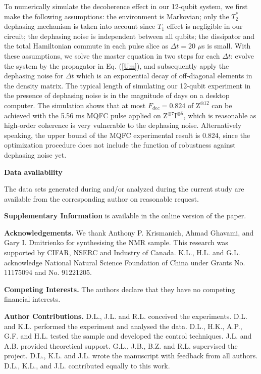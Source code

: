 \documentclass[twocolumn,reprint, amsmath,amssymb,showpacs,superscriptaddress]{revtex4-1}
\begin{document}
To numerically simulate the decoherence effect in our 12-qubit system, we first make the following assumptions: the environment is Markovian; only the $T_2^*$ dephasing mechanism is taken into account since $T_1$ effect is negligible in our circuit; the dephasing noise is independent between all qubits; the dissipator and the total Hamiltonian commute in each pulse slice as $\Delta t = 20$ $\mu$s is small. With these assumptions, we solve the master equation in two steps for each $\Delta t$: evolve the system by the propagator in Eq. (\ref{Um}), and subsequently apply the dephasing noise for $\Delta t$ which is an exponential decay of off-diagonal elements in the density matrix. The typical length of simulating our 12-qubit experiment in the presence of dephasing noise is in the magnitude of days on a desktop computer. The simulation shows that at most $F_{dec}=0.824$ of $\text{Z}^{\otimes 12}$ can be achieved with the 5.56 ms MQFC pulse applied on Z$^{\otimes 7}$I$^{\otimes 5}$, which is reasonable as high-order coherence is very vulnerable to the dephasing noise. Alternatively speaking, the upper bound of the MQFC experimental result is 0.824, since the optimization procedure does not include the function of robustness against dephasing noise yet.

\textbf{Data availability}

The data sets generated during and/or analyzed during the current study are available from the corresponding author on reasonable request.

\textbf{Supplementary Information} is available in the online version of the paper.

\textbf{Acknowledgements.} We thank Anthony P. Krismanich, Ahmad Ghavami, and Gary I. Dmitrienko for synthesising the NMR sample.  This
research was supported by CIFAR, NSERC and Industry of Canada. K.L., H.L. and G.L. acknowledge National Natural Science Foundation of China under Grants No. 11175094 and No. 91221205.

\textbf{Competing Interests.} The authors declare that they have no
competing financial interests.

\textbf{Author Contributions.} D.L., J.L. and R.L. conceived the experiments. D.L. and K.L. performed the experiment and analysed the data. D.L., H.K., A.P., G.F. and H.L. tested the sample and developed the control techniques. J.L. and A.B. provided theoretical support. G.L., J.B., B.Z. and R.L. supervised the project. D.L., K.L. and J.L. wrote the manuscript with feedback from all authors. D.L., K.L., and J.L. contributed equally to this work.
\end{document}
